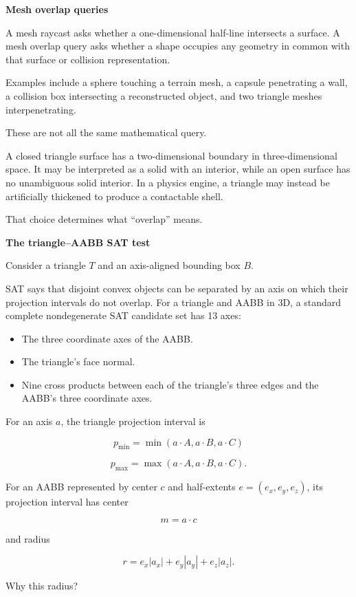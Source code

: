 \textbf{Mesh overlap queries}

A mesh raycast asks whether a one-dimensional half-line intersects a surface. A mesh overlap query asks whether a shape occupies any geometry in common with that surface or collision representation.

Examples include a sphere touching a terrain mesh, a capsule penetrating a wall, a collision box intersecting a reconstructed object, and two triangle meshes interpenetrating.

These are not all the same mathematical query.

A closed triangle surface has a two-dimensional boundary in three-dimensional space. It may be interpreted as a solid with an interior, while an open surface has no unambiguous solid interior. In a physics engine, a triangle may instead be artificially thickened to produce a contactable shell.

That choice determines what ``overlap'' means.

\textbf{The triangle--AABB SAT test}

Consider a triangle \(T\) and an axis-aligned bounding box \(B\).

SAT says that disjoint convex objects can be separated by an axis on which their projection intervals do not overlap. For a triangle and AABB in 3D, a standard complete nondegenerate SAT candidate set has 13 axes:

\begin{itemize}
\tightlist
\item
  The three coordinate axes of the AABB.
\item
  The triangle's face normal.
\item
  Nine cross products between each of the triangle's three edges and the AABB's three coordinate axes.
\end{itemize}

For an axis \(a\), the triangle projection interval is

\[
p_{\min}=\min(a\cdot A,a\cdot B,a\cdot C)
\]

\[
p_{\max}=\max(a\cdot A,a\cdot B,a\cdot C).
\]

For an AABB represented by center \(c\) and half-extents \(e=(e_x,e_y,e_z)\), its projection interval has center

\[
m=a\cdot c
\]

and radius

\[
r=e_x|a_x|+e_y|a_y|+e_z|a_z|.
\]

Why this radius?

